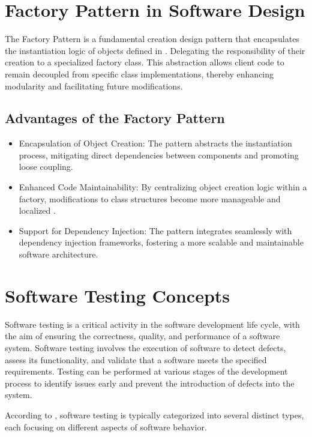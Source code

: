 \section{Factory Pattern in Software Design}\label{sec:FactoryPattern}
The Factory Pattern is a fundamental creation design pattern that encapsulates the instantiation logic of objects defined in \cite{Gamma1994}. Delegating the responsibility of their creation to a specialized factory class. This abstraction allows client code to remain decoupled from specific class implementations, thereby enhancing modularity and facilitating future modifications.

\subsection{Advantages of the Factory Pattern}
\begin{itemize} 
\item  Encapsulation of Object Creation: The pattern abstracts the instantiation process, mitigating direct dependencies between components and promoting loose coupling.
\item  Enhanced Code Maintainability: By centralizing object creation logic within a factory, modifications to class structures become more manageable and localized \cite{Martin2008Aug}.
\item Support for Dependency Injection: The pattern integrates seamlessly with dependency injection frameworks, fostering a more scalable and maintainable software architecture.
\end{itemize}

\section{Software Testing Concepts}

Software testing is a critical activity in the software development life cycle, with the aim of ensuring the correctness, quality, and performance of a software system. Software testing involves the execution of software to detect defects, assess its functionality, and validate that a software meets the specified requirements. Testing can be performed at various stages of the development process to identify issues early and prevent the introduction of defects into the system.

According to \cite{hooda2015software}, software testing is typically categorized into several distinct types, each focusing on different aspects of software behavior.

